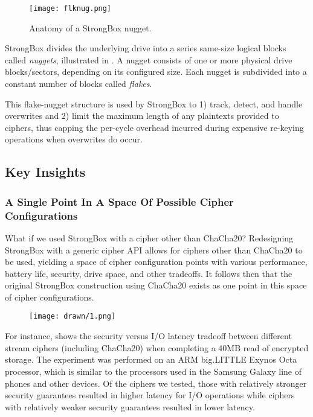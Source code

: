 \begin{figure}[ht]
   \centering
   \texttt{[image: flknug.png]}
   \caption{Anatomy of a StrongBox nugget.}\label{fig:flknug}
\end{figure}

StrongBox divides the underlying drive into a series same-size logical blocks
called \emph{nuggets}, illustrated in . A nugget consists of one
or more physical drive blocks/sectors, depending on its configured size. Each
nugget is subdivided into a constant number of blocks called \emph{flakes}.

This flake-nugget structure is used by StrongBox to 1) track, detect, and handle
overwrites and 2) limit the maximum length of any plaintexts provided to
ciphers, thus capping the per-cycle overhead incurred during expensive re-keying
operations when overwrites do occur.

\subsection{Key Insights}

\subsubsection{A Single Point In A Space Of Possible Cipher Configurations}

What if we used StrongBox with a cipher other than ChaCha20? Redesigning
StrongBox with a generic cipher API allows for ciphers other than ChaCha20 to be
used, yielding a space of cipher configuration points with various performance,
battery life, security, drive space, and other tradeoffs. It follows then that
the original StrongBox construction using ChaCha20 exists as one point in this
space of cipher configurations.

\begin{figure}[ht]
   \centering
   \texttt{[image: drawn/1.png]}
   \caption{}\label{fig:40mb-read}
\end{figure}

For instance,  shows the security versus I/O latency tradeoff
between different stream ciphers (including ChaCha20) when completing a 40MB
read of encrypted storage. The experiment was performed on an ARM big.LITTLE
Exynos Octa processor, which is similar to the processors used in the Samsung
Galaxy line of phones and other devices. Of the ciphers we tested, those with
relatively stronger security guarantees resulted in higher latency for I/O
operations while ciphers with relatively weaker security guarantees resulted in
lower latency.


